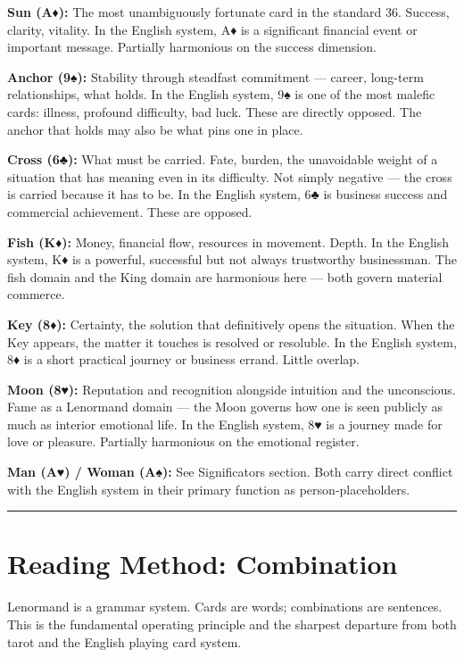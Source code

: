 \textbf{Sun (A♦):} The most unambiguously fortunate card in the standard 36. Success, clarity, vitality. In the English system, A♦ is a significant financial event or important message. Partially harmonious on the success dimension.

\textbf{Anchor (9♠):} Stability through steadfast commitment --- career, long-term relationships, what holds. In the English system, 9♠ is one of the most malefic cards: illness, profound difficulty, bad luck. These are directly opposed. The anchor that holds may also be what pins one in place.

\textbf{Cross (6♣):} What must be carried. Fate, burden, the unavoidable weight of a situation that has meaning even in its difficulty. Not simply negative --- the cross is carried because it has to be. In the English system, 6♣ is business success and commercial achievement. These are opposed.

\textbf{Fish (K♦):} Money, financial flow, resources in movement. Depth. In the English system, K♦ is a powerful, successful but not always trustworthy businessman. The fish domain and the King domain are harmonious here --- both govern material commerce.

\textbf{Key (8♦):} Certainty, the solution that definitively opens the situation. When the Key appears, the matter it touches is resolved or resoluble. In the English system, 8♦ is a short practical journey or business errand. Little overlap.

\textbf{Moon (8♥):} Reputation and recognition alongside intuition and the unconscious. Fame as a Lenormand domain --- the Moon governs how one is seen publicly as much as interior emotional life. In the English system, 8♥ is a journey made for love or pleasure. Partially harmonious on the emotional register.

\textbf{Man (A♥) / Woman (A♠):} See Significators section. Both carry direct conflict with the English system in their primary function as person-placeholders.

\begin{center}\rule{0.5\linewidth}{0.5pt}\end{center}

\section{Reading Method: Combination}\label{reading-method-combination}

Lenormand is a grammar system. Cards are words; combinations are sentences. This is the fundamental operating principle and the sharpest departure from both tarot and the English playing card system.

